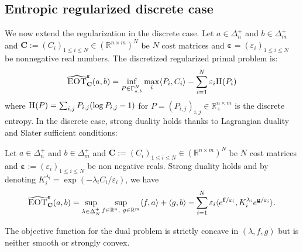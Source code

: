 \subsection{Entropic regularized discrete case}
\label{dis:entropic}


We now extend the regularization in the discrete case. 
Let $a\in\Delta_n^{+}$ and $b\in\Delta^+_m$ and $\mathbf{C}:=(C_i)_{1\leq i\leq N}\in\left(\mathbb{R}^{n\times m}\right)^N$ be $N$ cost matrices and $\bm{\varepsilon}=(\varepsilon_i)_{1\leq i\leq N}$ be nonnegative real numbers. The discretized regularized primal problem is:
\begin{align*}
    \widehat{\textsc{EOT}}^{\bm{\varepsilon}}_{\mathbf{C}}(a,b)=\inf_{P\in \Gamma_{a,b}^N} \max_i \langle P_i,C_i\rangle -\sum_{i=1}^N\varepsilon_i \textsc{H}(P_i)
\end{align*}
where $\textsc{H}(P) = \sum_{i,j}P_{i,j}(\log P_{i,j}-1)$ for $P=(P_{i,j})_{i,j}\in \mathbb{R}_+^{n\times m}$ is the discrete entropy. In the discrete case, strong duality holds thanks to Lagrangian duality and Slater sufficient conditions:
 
\begin{prop}
\label{prop:discrete-reg-dual}
Let $a\in\Delta_n^{+}$ and $b\in\Delta^+_m$ and $\mathbf{C}:=(C_i)_{1\leq i\leq N}\in\left(\mathbb{R}^{n\times m}\right)^N$ be $N$ cost matrices and $\bm{\varepsilon}:=(\varepsilon_i)_{1\leq i\leq N}$ be non negative reals. Strong duality holds and by denoting $K_i^{\lambda_i} =\exp\left(-\lambda_i C_{i}/\varepsilon_i\right)$, we have
\begin{align*}
\widehat{\textsc{EOT}}_{\mathbf{C}}^{\bm{\varepsilon}}(a,b)=\sup_{\lambda\in\Delta^+_N}\sup\limits_{f\in \mathbb{R}^n,~g\in \mathbb{R}^m} \langle f, a\rangle+\langle g,b\rangle-\sum_{i=1}^N\varepsilon_i\langle e^{\mathbf{f}/\varepsilon_i},K_i^{\lambda_i} e^{\mathbf{g}/\varepsilon_i}\rangle.
\end{align*}
\end{prop}
The objective function for the dual problem is strictly concave in $(\lambda,f,g)$ but is neither smooth or strongly convex. 


